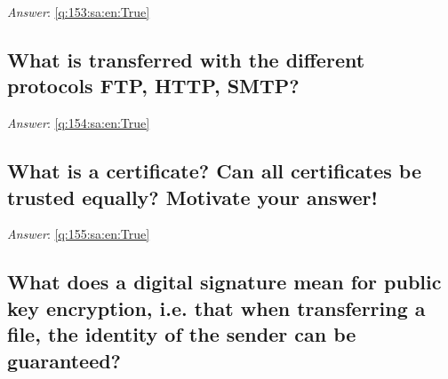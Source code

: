\documentclass[a4paper,11pt,oneside]{article}
\begin{document}
\begin{sloppypar}
\label{q:153:sa:en:False}

\vspace{2cm}

\noindent\makebox[\textwidth]{\hrulefill}

\vspace{1cm}

\textit{Answer}: \autoref{q:153:sa:en:True}



\subsection{What is transferred with the different protocols FTP, HTTP, SMTP?}

\label{q:154:sa:en:False}

\vspace{2cm}

\noindent\makebox[\textwidth]{\hrulefill}

\vspace{1cm}

\textit{Answer}: \autoref{q:154:sa:en:True}



\subsection{What is a certificate? Can all certificates be trusted equally? Motivate your answer!}

\label{q:155:sa:en:False}

\vspace{2cm}

\noindent\makebox[\textwidth]{\hrulefill}

\vspace{1cm}

\textit{Answer}: \autoref{q:155:sa:en:True}



\subsection{What does a digital signature mean for public key encryption, i.e. that when transferring a file, the identity of the sender can be guaranteed?}

\label{q:156:sa:en:False}

\vspace{2cm}

\noindent\makebox[\textwidth]{\hrulefill}

\vspace{1cm}


\end{sloppypar}
\end{document}
